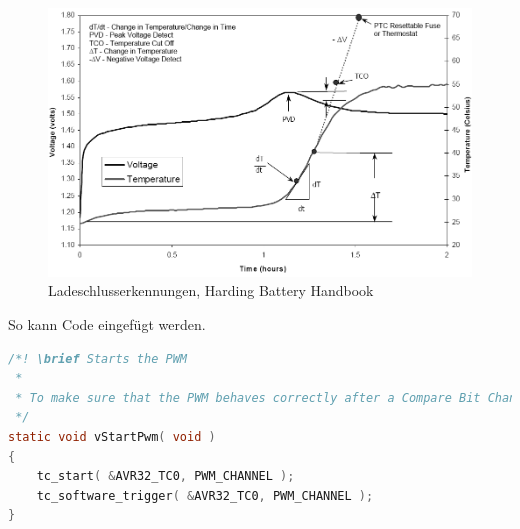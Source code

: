 \begin{figure}[ht!]
\centering
\includegraphics[angle=0,width=14cm]{LatexBeispiel/Bilder/Ladeschlussbw.png}
\caption{Ladeschlusserkennungen, Harding Battery Handbook\cite{Harding}}
\label{Ladeschluss}
\end{figure}

\newpage
So kann Code eingefügt werden.
\begin{lstlisting}[frame=single,breaklines=true,basicstyle=\tiny,language=C,label={PWMStart},caption={Kommentierter Start der PWM}]
/*! \brief Starts the PWM
 * 
 * To make sure that the PWM behaves correctly after a Compare Bit Change the PWM is started and reset with a software trigger.
 */
static void vStartPwm( void )
{
	tc_start( &AVR32_TC0, PWM_CHANNEL );
	tc_software_trigger( &AVR32_TC0, PWM_CHANNEL );
}
\end{lstlisting}
